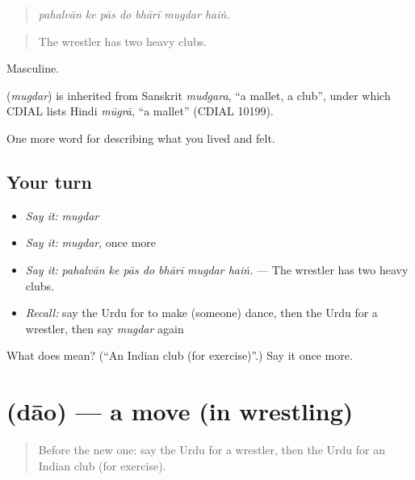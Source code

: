\begin{quote}
\emph{pahalvān ke pās do bhārī mugdar haiṅ.}
\end{quote}

\begin{quote}
The wrestler has two heavy clubs.
\end{quote}

Masculine.

\begin{cousinweb}
\textbf{} (\emph{mugdar}) is inherited from Sanskrit \emph{mudgara}, \textquotedblleft{}a mallet, a club\textquotedblright{}, under which CDIAL lists Hindi \emph{mūgrā}, \textquotedblleft{}a mallet\textquotedblright{} (CDIAL 10199).
\end{cousinweb}

\begin{grammarlens}[title={What you've built}]
One more word for describing what you lived and felt.
\end{grammarlens}

\subsection*{Your turn}
\begin{itemize}
\raggedright
  \item \emph{Say it:} \emph{mugdar}
  \item \emph{Say it:} \emph{mugdar}, once more
  \item \emph{Say it:} \emph{pahalvān ke pās do bhārī mugdar haiṅ.} — The wrestler has two heavy clubs.
  \item \emph{Recall:} say the Urdu for to make (someone) dance, then the Urdu for a wrestler, then say \emph{mugdar} again
\end{itemize}

\begin{tcolorbox}[breakable,colback=teal!4,colframe=teal!35!black,title={Before you move on}]
What does  mean? (\textquotedblleft{}An Indian club (for exercise)\textquotedblright{}.) Say it once more.
\end{tcolorbox}
\section[\texorpdfstring{\ur{داؤ} (dāo)}{داؤ (dāo)}]{ (dāo) — a move (in wrestling)}

\label{lesson:UR-C520-dao}



\begin{quote}
Before the new one: say the Urdu for a wrestler, then the Urdu for an Indian club (for exercise).
\end{quote}

